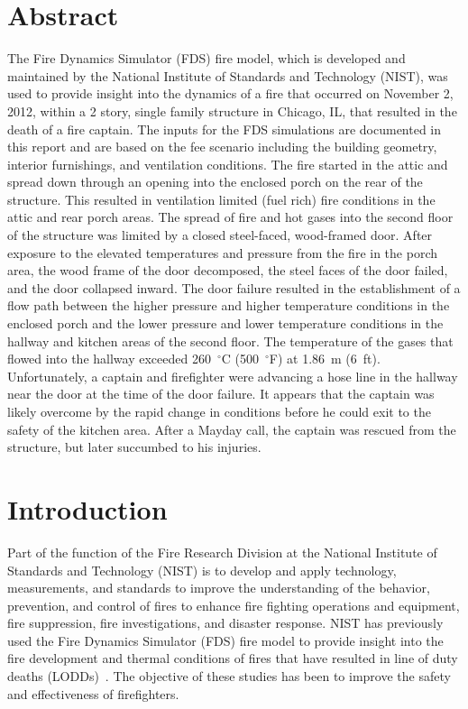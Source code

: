 \documentclass[12pt,oneside]{book}
\begin{document}
\chapter*{\centering Abstract}
The Fire Dynamics Simulator (FDS) fire model, which is developed and maintained by the National Institute of Standards and Technology (NIST), was used to provide insight into the dynamics of a fire that occurred on November 2, 2012, within a 2  story, single family structure in Chicago, IL, that resulted in the death of a fire captain. The inputs for the FDS simulations are documented in this report and are based on the fee scenario including the building geometry, interior furnishings, and ventilation conditions. The fire started in the attic and spread down through an opening into the enclosed porch on the rear of the structure. This resulted in ventilation limited (fuel rich) fire conditions in the attic and rear porch areas. The spread of fire and hot gases into the second floor of the structure was limited by a closed steel-faced, wood-framed door. After exposure to the elevated temperatures and pressure from the fire in the porch area, the wood frame of the door decomposed, the steel faces of the door failed, and the door collapsed inward. The door failure resulted in the establishment of a flow path between the higher pressure and higher temperature conditions in the enclosed porch and the lower pressure and lower temperature conditions in the hallway and kitchen areas of the second floor. The temperature of the gases that flowed into the hallway exceeded 260~$^{\circ}$C (500~$^{\circ}$F) at 1.86~m (6~ft). Unfortunately, a captain and firefighter were advancing a hose line in the hallway near the door at the time of the door failure. It appears that the captain was likely overcome by the rapid change in conditions before he could exit to the safety of the kitchen area. After a Mayday call, the captain was rescued from the structure, but later succumbed to his injuries.

\chapter{Introduction}
Part of the function of the Fire Research Division at the National Institute of Standards and Technology (NIST) is to develop and apply technology, measurements, and standards to improve the understanding of the behavior, prevention, and control of fires to enhance fire fighting operations and equipment, fire suppression, fire investigations, and disaster response. NIST has previously used the Fire Dynamics Simulator (FDS) fire model to provide insight into the fire development and thermal conditions of fires that have resulted in line of duty deaths (LODDs)~\cite{Madrzykowski:1,Iowa,Texas,Bryner:Charleston,barowy:texas}. The objective of these studies has been to improve the safety and effectiveness of firefighters.
\end{document}
